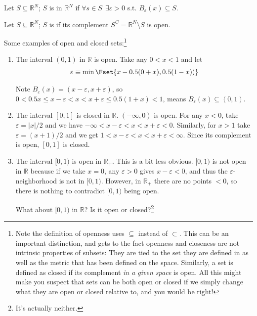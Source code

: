 \documentclass{article}
\begin{document}
\begin{definition}[open]\label{def:lecture1_open_set}
  Let $S \subseteq \mathbb{R}^{N}$; $S$ is  in $\mathbb{R}^N$ if $\forall s \in S ~~ \exists \varepsilon > 0$ s.t. $B_{\varepsilon}(x) \subseteq S$.
\end{definition}

\begin{definition}[closed]\label{def:lecture1_closed_set}
  Let $S \subseteq \mathbb{R}^{N}$; $S$ is  if its complement $S^C = \mathbb{R}^N \setminus S$ is open.
\end{definition}

Some examples of open and closed sets:\footnote{Note the definition of openness uses $\subseteq$ instead of $\subset$. This can be an important distinction, and gets to the fact openness and closeness are not intrinsic properties of subsets: They are tied to the set they are defined in as well as the metric that has been defined on the space. Similarly, a set is defined as closed if its complement \textit{in a given space} is open. All this might make you suspect that sets can be both open or closed if we simply change what they are open or closed relative to, and you would be right!}
\begin{enumerate}
  \item The interval $(0, 1)$ in $\mathbb{R}$ is open. Take any $0 < x < 1$ and let
    \begin{align*}
      \varepsilon \equiv \min\Fset{x - 0.5 (0 + x), 0.5 (1 - x))}
    \end{align*}

    Note $B_{\varepsilon}(x) = (x - \varepsilon, x + \varepsilon)$, so $0 < 0.5x \le x - \varepsilon < x < x + \varepsilon \le 0.5(1 + x) < 1$, means $B_{\varepsilon}(x) \subseteq (0, 1)$.

  \item The interval $[0, 1]$ is closed in $\mathbb{R}$. $(-\infty, 0)$ is open. For any $x < 0$, take $\varepsilon = |x| / 2$ and we have $-\infty < x - \varepsilon < x < x + \varepsilon < 0$. Similarly, for $x > 1$ take $\varepsilon = (x + 1) / 2$ and we get $1 < x - \varepsilon < x < x + \varepsilon < \infty$. Since its complement is open, $[0, 1]$ is closed.

  \item The interval $[0, 1)$ is open in $\mathbb{R}_+$. This is a bit less obvious. $[0, 1)$ is not open in $\mathbb{R}$ because if we take $x = 0$, any $\varepsilon > 0$ gives $x - \varepsilon < 0$, and thus the $\varepsilon$-neighborhood is not in $[0, 1)$. However, in $\mathbb{R}_+$ there are no points $< 0$, so there is nothing to contradict $[0, 1)$ being open.

    What about $[0, 1)$ in $\mathbb{R}$? Is it open or closed?\footnote{It's actually neither.}
\end{enumerate}
\end{document}
